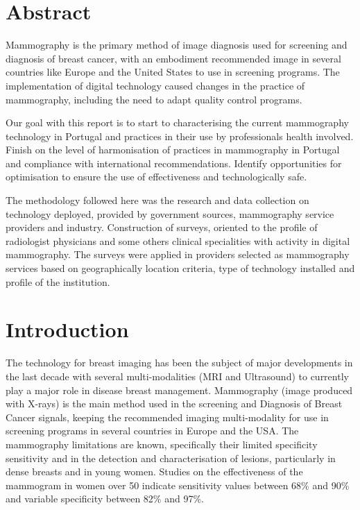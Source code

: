 \begin{titlepage}

\vfill %

\end{titlepage}

\section{Abstract}

Mammography is the primary method of image diagnosis used for screening and diagnosis of breast cancer, with an embodiment recommended image in several countries like Europe and the United States to use in screening programs. The implementation of digital technology caused changes in the practice of mammography, including the need to adapt quality control programs.

Our goal with this report is to start to characterising the current mammography technology in Portugal and practices in their use by professionals health involved. Finish on the level of harmonisation of practices in mammography in Portugal and compliance with international recommendations. Identify opportunities for optimisation to ensure the use of effectiveness and technologically safe.

The methodology followed here was the research and data collection on technology deployed, provided by government sources, mammography service providers and industry. Construction of surveys, oriented to the profile of radiologist physicians and some others clinical specialities with activity in digital mammography. The surveys were applied in providers selected as mammography services based on geographically location criteria, type of technology installed and profile of the institution.

\clearpage

\section{Introduction}

The technology for breast imaging has been the subject of major developments in the last decade with several multi-modalities (MRI and Ultrasound) to currently play a major role in disease breast management. Mammography (image produced with X-rays) is the main method used in the screening and Diagnosis of Breast Cancer signals, keeping the recommended imaging multi-modality for use in screening programs in several countries in Europe and the USA. The mammography limitations are known, specifically their limited specificity sensitivity and in the detection and characterisation of lesions, particularly in dense breasts and in young women. Studies on the effectiveness of the mammogram in women over 50 indicate sensitivity values between 68\% and 90\% and variable specificity between 82\% and 97\%.

